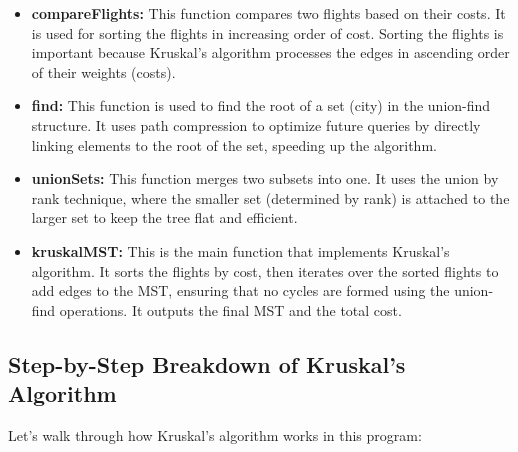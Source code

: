 \documentclass{book}
\begin{document}
\begin{itemize}
    \item \textbf{compareFlights:} This function compares two flights based on their costs. It is used for sorting the flights in increasing order of cost. Sorting the flights is important because Kruskal's algorithm processes the edges in ascending order of their weights (costs).
    
    \item \textbf{find:} This function is used to find the root of a set (city) in the union-find structure. It uses path compression to optimize future queries by directly linking elements to the root of the set, speeding up the algorithm.
    
    \item \textbf{unionSets:} This function merges two subsets into one. It uses the union by rank technique, where the smaller set (determined by rank) is attached to the larger set to keep the tree flat and efficient.
    
    \item \textbf{kruskalMST:} This is the main function that implements Kruskal's algorithm. It sorts the flights by cost, then iterates over the sorted flights to add edges to the MST, ensuring that no cycles are formed using the union-find operations. It outputs the final MST and the total cost.
\end{itemize}

\subsection{Step-by-Step Breakdown of Kruskal's Algorithm}

Let’s walk through how Kruskal's algorithm works in this program:
\end{document}
